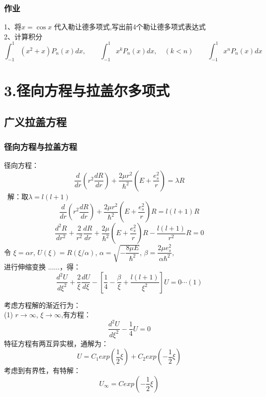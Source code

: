 \begin{frame}
	\frametitle{作业}
	1、将$x=\cos x$ 代入勒让德多项式,写出前4个勒让德多项式表达式 \\
	2、计算积分
	\begin{equation*}
		\int_{-1}^{1} (x^2+x) P_n(x) dx, \qquad \int_{-1}^{1} x^k P_n(x) dx, \quad(k<n) \qquad  	\int_{-1}^{1} x^n P_n(x) dx   
	\end{equation*}
\end{frame}	



\section{3.径向方程与拉盖尔多项式}

\subsection{广义拉盖方程}

\begin{frame}
	\frametitle{径向方程与拉盖方程}
	径向方程：
	\begin{equation*}
		\frac{d}{d r} (r^2\frac{d R }{d r} ) + \frac{2 \mu r^2} {\hbar^2}(E+ \frac{e_s ^2}{r} ) =\lambda R
	\end{equation*}	
	\alert{ 解：}取$ \lambda =l(l+1)  $
	\begin{equation*}
		\frac{d}{d r} (r^2\frac{d R }{d r} ) + \frac{2 \mu r^2} {\hbar^2}(E+ \frac{e_s ^2}{r} ) R=l(l+1) R
	\end{equation*}	
	\begin{equation*}
		\frac{d^2 R}{d r^2} + \frac{2}{r^2}\frac{d R }{d r}  + \frac{2 \mu} {\hbar^2}(E+ \frac{e_s ^2}{r} ) R- \frac{l(l+1)}{r^2} R=0
	\end{equation*}	
	令 $\xi=\alpha r$, $U(\xi)=R(\xi /\alpha) $, $\alpha =\sqrt{-\dfrac{8\mu E}{\hbar^2}}$, $\beta=\dfrac{2\mu e^2 _s}{\alpha \hbar^2}$,\\
	进行伸缩变换 ......，得：
	\begin{equation*}
		\frac{d^2 U}{d \xi ^2} + \frac{2}{\xi }\frac{d U }{d \xi}  -[ \frac{1} {4}  -\frac{\beta}{\xi} + \frac{l(l+1)}{\xi ^2}] U=0  \cdots (1)
	\end{equation*}	 
\end{frame}	

\begin{frame}
	考虑方程解的渐近行为： \\
	(1) $r\to \infty$, $\xi \to \infty$,有方程：
	\begin{equation*}
		\frac{d^2 U}{d \xi ^2}   - \frac{1} {4}  U=0
	\end{equation*}	
	特征方程有两互异实根，通解为：
	\begin{equation*}
		U=C_1 exp(\frac{1}{2}\xi ) +C_2 exp(-\frac{1}{2}\xi ) 
	\end{equation*}	
	考虑到有界性，有特解：
	\begin{equation*}
		U_\infty  =  C  exp(-\frac{1}{2}\xi ) 
	\end{equation*}	
\end{frame}	

